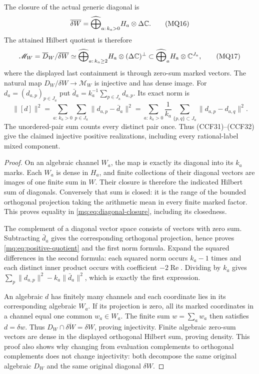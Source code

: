 \begin{theorem}
\label{mq:thm:closure}
The closure of the actual generic diagonal is
\[
 \overline{\delta W}=
 \widehat\bigoplus_{a:\,k_a>0}H_a\otimes\Delta\mathbb C.
 \tag{MQ16}\label{mq:eq:diagonal-closure}
\]
The attained Hilbert quotient is therefore
\[
 \mathscr M_W=\overline D_W/\overline{\delta W}
 \simeq\widehat\bigoplus_{a:\,k_a\ge2}
          H_a\otimes(\Delta\mathbb C)^{\perp}\subset
          \widehat\bigoplus_a H_a\otimes\mathbb C^{J_a},
 \tag{MQ17}\label{mq:eq:positive-quotient}
\]
where the displayed last containment is through zero-sum marked
vectors. The natural map
$D_W/\delta W\to\mathscr M_W$ is injective and has dense image.
For $d_a=(d_{a,p})_{p\in J_a}$ put
$\bar d_a=k_a^{-1}\sum_{p\in J_a}d_{a,p}$. Its exact norm is
\[
 \|[d]\|^2=
 \sum_{a:\,k_a>0}\sum_{p\in J_a}\|d_{a,p}-\bar d_a\|^2
 =\sum_{a:\,k_a>0}\frac1{k_a}
           \sum_{\{p,q\}\subset J_a}\|d_{a,p}-d_{a,q}\|^2.
 \tag{MQ18}\label{mq:eq:variance}
\]
The unordered-pair sum counts every distinct pair once.
Thus (CCF31)--(CCF32) give the claimed injective positive
realizations, including every rational-label mixed component.
\end{theorem}
\begin{proof}
On an algebraic channel $W_a$, the map is exactly its diagonal
into its $k_a$ marks. Each $W_a$ is dense in $H_a$, and finite
collections of their diagonal vectors are images of one finite sum
in $W$. Their closure is therefore the indicated Hilbert sum of
diagonals. Conversely that sum is closed: it is the range of the
bounded orthogonal projection taking the arithmetic mean in every
finite marked factor. This proves equality in
\eqref{mq:eq:diagonal-closure}, including its closedness.

The complement of a diagonal vector space consists of vectors with
zero sum. Subtracting $\bar d_a$ gives the corresponding orthogonal
projection, hence proves \eqref{mq:eq:positive-quotient} and the first
norm formula. Expand the squared differences in the second formula:
each squared norm occurs $k_a-1$ times and each distinct inner
product occurs with coefficient $-2\operatorname{Re}$. Dividing
by $k_a$ gives
$\sum_p\|d_{a,p}\|^2-k_a\|\bar d_a\|^2$, which is exactly
the first expression.

An algebraic $d$ has finitely many channels and each coordinate
lies in its corresponding algebraic $W_a$. If its projection is
zero, all its marked coordinates in a channel equal one common
$w_a\in W_a$. The finite sum $w=\sum_a w_a$ then satisfies
$d=\delta w$. Thus
$D_W\cap\overline{\delta W}=\delta W$, proving injectivity.
Finite algebraic zero-sum vectors are dense in the displayed
orthogonal Hilbert sum, proving density. This proof also shows
why changing from evaluation complements to orthogonal complements
does not change injectivity: both decompose the same original
algebraic $D_W$ and the same original diagonal $\delta W$.
\end{proof}

